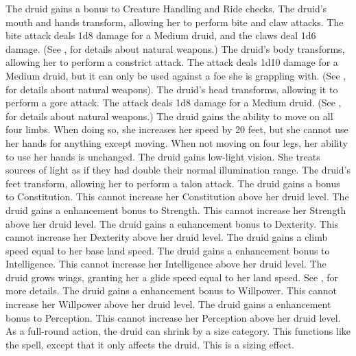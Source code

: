 The druid gains a  bonus to Creature Handling and Ride checks.
The druid's mouth and hands transform, allowing her to perform bite and claw attacks.
The bite attack deals 1d8 damage for a Medium druid, and the claws deal 1d6 damage.
(See , for details about natural weapons.)
The druid's body transforms, allowing her to perform a constrict attack.
The attack deals 1d10 damage for a Medium druid, but it can only be used against a foe she is grappling with.
(See , for details about natural weapons).
The druid's head transforms, allowing it to perform a gore attack.
The attack deals 1d8 damage for a Medium druid.
(See , for details about natural weapons.)
The druid gains the ability to move on all four limbs.
When doing so, she increases her speed by 20 feet, but she cannot use her hands for anything except moving.
When not moving on four legs, her ability to use her hands is unchanged.
The druid gains low-light vision.
She treats sources of light as if they had double their normal illumination range.
The druid's feet transform, allowing her to perform a talon attack.
The druid gains a  bonus to Constitution.
This cannot increase her Constitution above her druid level.
The druid gains a  enhancement bonus to Strength.
This cannot increase her Strength above her druid level.
The druid gains a  enhancement bonus to Dexterity.
This cannot increase her Dexterity above her druid level.
The druid gains a climb speed equal to her base land speed.
The druid gains a  enhancement bonus to Intelligence.
This cannot increase her Intelligence above her druid level.
The druid grows wings, granting her a glide speed equal to her land speed.
See , for more details.
The druid gains a  enhancement bonus to Willpower.
This cannot increase her Willpower above her druid level.
The druid gains a  enhancement bonus to Perception.
This cannot increase her Perception above her druid level.
As a full-round action, the druid can shrink by a size category.
This functions like the  spell, except that it only affects the druid.
This is a sizing effect.
